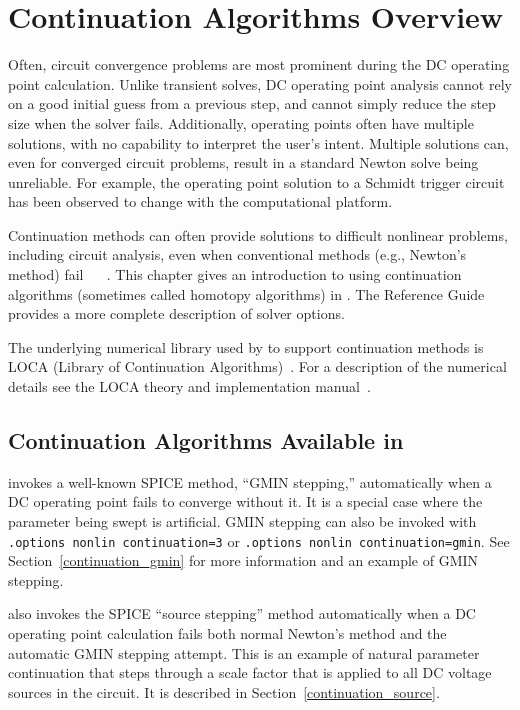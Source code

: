 \section{Continuation Algorithms Overview}

\label{continuation_Overview}

Often, circuit convergence problems are most prominent during the DC operating
point calculation. Unlike transient solves, DC operating point analysis cannot
rely on a good initial guess from a previous step, and cannot simply reduce the
step size when the solver fails. Additionally, operating points often have
multiple solutions, with no capability to interpret the user's intent. Multiple
solutions can, even for converged circuit problems, result in a standard Newton
solve being unreliable. For example, the operating point solution to a Schmidt
trigger circuit has been observed to change with the computational platform.

Continuation methods can often provide solutions to difficult nonlinear problems,
including circuit analysis, even when conventional methods (e.g., Newton's
method) fail ~\cite{Melville:1990} ~\cite{Melville:1993}.  This chapter gives
an introduction to using continuation algorithms (sometimes called homotopy 
algorithms) in \Xyce{}. The \Xyce{} Reference Guide\ReferenceGuide{} provides a
more complete description of solver options.

The underlying numerical library used by \Xyce{} to support continuation methods
is LOCA (Library of Continuation Algorithms)~\cite{loca,loca2}.  For a description 
of the numerical details see the LOCA theory and implementation 
manual~\cite{locaManual}.

\subsection{Continuation Algorithms Available in \Xyce{}}

\Xyce{} invokes a well-known SPICE method, ``GMIN stepping,'' automatically
when a DC operating point fails to converge without it.  It is a special case
where the parameter being swept is artificial.  GMIN stepping can also be
invoked with \texttt{.options nonlin continuation=3} or \texttt{.options nonlin
continuation=gmin}. See Section~\ref{continuation_gmin} for more information and an
example of GMIN stepping.

\Xyce{} also invokes the SPICE ``source stepping'' method automatically when a DC operating point calculation fails both normal Newton's method and the automatic GMIN stepping attempt.  This is an example of natural parameter continuation that steps through a scale factor that is applied to all DC voltage sources in the circuit.  It is described in Section~\ref{continuation_source}.


